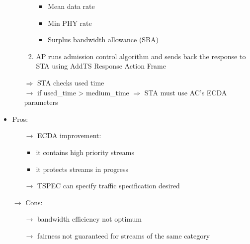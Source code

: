 \begin{itemize}
\begin{itemize}
\begin{enumerate}
\begin{itemize}
            \item Mean data rate
            \item Min PHY rate
            \item Surplus bandwidth allowance (SBA)
           \end{itemize}
           \item AP runs admission control algorithm and sends back the response to
           \hspace*{-0.3cm}STA using AddTS Response Action Frame
        \end{enumerate}
        $\Rightarrow$ STA checks used time\\
        $\rightarrow$ if used\_time > medium\_time $\Rightarrow$ STA must use AC's ECDA parameters
    \end{itemize}
    \item Pros:
    \begin{itemize}
        \item[$\rightarrow$] ECDA improvement:
        \begin{itemize}
            \item it contains high priority streams
            \item it protects streams in progress 
        \end{itemize}
        \item[$\rightarrow$] TSPEC can specify traffic specification desired
    \end{itemize}
    \item[$\rightarrow$] Cons:
    \begin{itemize}
        \item[$\rightarrow$] bandwidth efficiency not optimum
        \item[$\rightarrow$] fairness not guaranteed for streams of the same category
    \end{itemize} 
\end{itemize}
